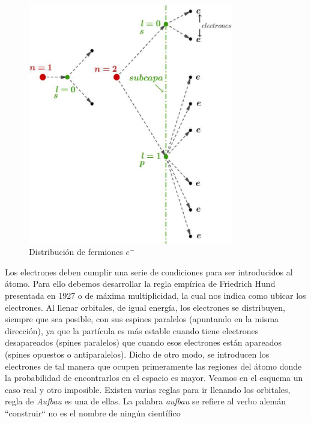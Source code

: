 \begin{figure}[H]
    \centering
    \includegraphics[width=0.8\textwidth]{./Figures/fig120}
	\caption{Distribución de fermiones $e^{-}$}
	\label{fig:120}
 \end{figure}


Los electrones deben cumplir una serie de condiciones para ser introducidos al átomo. Para ello debemos desarrollar la regla empírica de Friedrich Hund presentada en 1927 o de máxima multiplicidad, la cual nos indica como ubicar los electrones. Al llenar orbitales, de igual energía, los electrones se distribuyen, siempre que sea posible, con sus espines paralelos (apuntando en la misma dirección), ya que la partícula es más estable cuando tiene electrones desapareados (spines paralelos) que cuando esos electrones están apareados (spines opuestos o antiparalelos). Dicho de otro modo, se introducen los electrones de tal manera que ocupen primeramente las regiones del átomo donde la probabilidad de encontrarlos en el espacio es mayor. Veamos en el esquema un caso real y otro imposible. Existen varias reglas para ir llenando los orbitales, regla de \textit{Aufbau} es una de ellas. La palabra \textit{aufbau} se refiere al verbo alemán “construir“ no es el nombre de ningún científico

